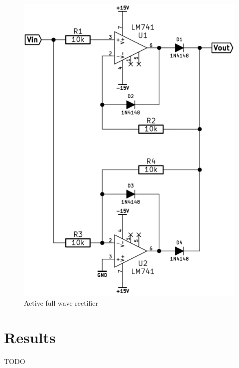 \documentclass[]{article}
\begin{document}
\begin{figure}[htbp]
\centering
\includegraphics[scale=0.5]{img/fwr.png}
\caption{Active full wave rectifier}
\end{figure}

\section{Results}\label{setup}
TODO
\end{document}
